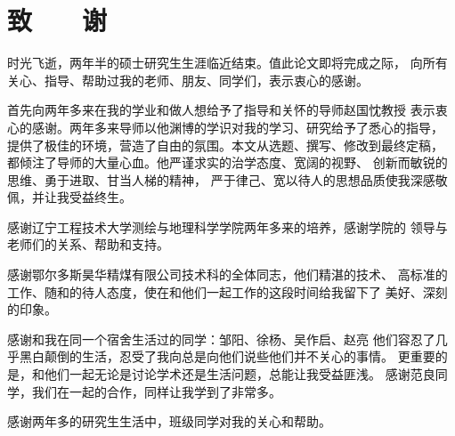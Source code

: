 ﻿%

%
%

\chapter*{\hfill 致　　谢 \hfill}

时光飞逝，两年半的硕士研究生生涯临近结束。值此论文即将完成之际，
向所有关心、指导、帮助过我的老师、朋友、同学们，表示衷心的感谢。

首先向两年多来在我的学业和做人想给予了指导和关怀的导师赵国忱教授
表示衷心的感谢。两年多来导师以他渊博的学识对我的学习、研究给予了悉心的指导，
提供了极佳的环境，营造了自由的氛围。本文从选题、撰写、修改到最终定稿，
都倾注了导师的大量心血。他严谨求实的治学态度、宽阔的视野、
创新而敏锐的思维、勇于进取、甘当人梯的精神，
严于律己、宽以待人的思想品质使我深感敬佩，并让我受益终生。

感谢辽宁工程技术大学测绘与地理科学学院两年多来的培养，感谢学院的
领导与老师们的关系、帮助和支持。

感谢鄂尔多斯昊华精煤有限公司技术科的全体同志，他们精湛的技术、
高标准的工作、随和的待人态度，使在和他们一起工作的这段时间给我留下了
美好、深刻的印象。

感谢和我在同一个宿舍生活过的同学：邹阳、徐杨、吴作启、赵亮
他们容忍了几乎黑白颠倒的生活，忍受了我向总是向他们说些他们并不关心的事情。
更重要的是，和他们一起无论是讨论学术还是生活问题，总能让我受益匪浅。
感谢范良同学，我们在一起的合作，同样让我学到了非常多。

感谢两年多的研究生生活中，班级同学对我的关心和帮助。






